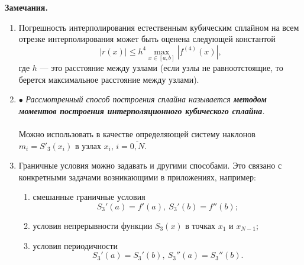 \documentclass[a4paper, 12pt]{report}
\numberwithin{equation}{section}
\renewcommand{\leq}{\leqslant}
\begin{document}
	 \textbf{Замечания.}\begin{enumerate}
	 	\item Погрешность интерполирования естественным кубическим сплайном на всем отрезке интерполирования может быть оценена следующей константой \begin{equation}
	 		|r(x)|\leq h^4\max_{x\in [a,b]}|f^{(4)}(x)|,
	 	\end{equation}
	 	где $h$ --- это расстояние между узлами (если узлы не равноотстоящие, то берется максимальное расстояние между узлами).
	 	\item $\bullet$ \textit{Рассмотренный способ построения сплайна называется \textbf{методом моментов построения интерполяционного кубического сплайна}.}\\\\
	 	 Можно использовать в качестве определяющей систему наклонов $m_i = S'_3(x_i)$ в узлах $x_i$, $i=\overline{0,N}$.
	 	\item Граничные условия можно задавать и другими способами. Это связано с конкретными задачами возникающими в приложениях, например:
	 	\begin{enumerate}
	 		\item смешанные граничные условия $$S_3'(a) = f'(a),\ S_3'(b) = f''(b);$$
	 		\item условия непрерывности функции $S_3(x)$ в точках $x_1$ и $x_{N-1}$;
	 		\item условия периодичности $$S_3'(a) = S_3'(b),\ S_3''(a) = S_3''(b).$$
	 	\end{enumerate}
	 \end{enumerate}
\end{document}

